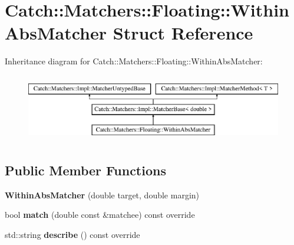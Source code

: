 \hypertarget{struct_catch_1_1_matchers_1_1_floating_1_1_within_abs_matcher}{}\section{Catch\+:\+:Matchers\+:\+:Floating\+:\+:Within\+Abs\+Matcher Struct Reference}
\label{struct_catch_1_1_matchers_1_1_floating_1_1_within_abs_matcher}
Inheritance diagram for Catch\+:\+:Matchers\+:\+:Floating\+:\+:Within\+Abs\+Matcher\+:\begin{figure}[H]
\begin{center}
\leavevmode
\includegraphics[height=2.968198cm]{struct_catch_1_1_matchers_1_1_floating_1_1_within_abs_matcher}
\end{center}
\end{figure}
\subsection*{Public Member Functions}
\begin{DoxyCompactItemize}
\item 
\mbox{\label{struct_catch_1_1_matchers_1_1_floating_1_1_within_abs_matcher_ac45340b98c41230a7def5bd86c2d870f}} 
{\bfseries Within\+Abs\+Matcher} (double target, double margin)
\item 
\mbox{\label{struct_catch_1_1_matchers_1_1_floating_1_1_within_abs_matcher_afa5d8eed57f12c1e5d006471eb0bfe72}} 
bool {\bfseries match} (double const \&matchee) const override
\item 
\mbox{\label{struct_catch_1_1_matchers_1_1_floating_1_1_within_abs_matcher_a206a738680f8767af31d3f1835afff3f}} 
std\+::string {\bfseries describe} () const override
\end{DoxyCompactItemize}
